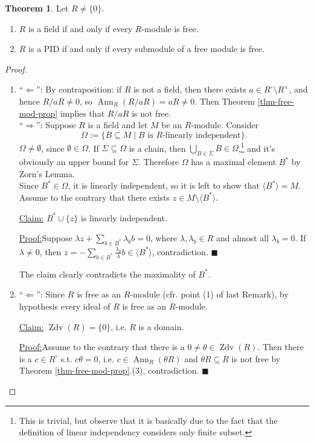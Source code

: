 \documentclass[12pt,a4paper]{report}
\theoremstyle{definition}
\newtheorem{theorem}{Theorem}[chapter] %
\theoremstyle{num.custom-title}
\newenvironment{claim}[1]{\par\noindent\underline{Claim#1:}\space}{} %
\newenvironment{claimproof}[1]{\par\noindent\underline{Proof:}\space#1}{\leavevmode\unskip\penalty9999 \hbox{}\nobreak\hfill\quad\hbox{$\blacksquare$}} %
\DeclareMathOperator{\Zdv}{Zdv}
\DeclareMathOperator{\Ann}{Ann}
\DeclareMathOperator{\imp}{\Rightarrow}
\DeclareMathOperator{\pmi}{\Leftarrow}
\DeclareMathOperator{\sm}{\setminus}
\DeclareMathOperator{\sse}{\subseteq}
\begin{document}
\begin{theorem}\label{char_fields_and_pid}
Let $R \neq \{0\}$.
\begin{enumerate}
\item $R$ is a field if and only if every $R$-module is free.
\item $R$ is a PID if and only if every submodule of a free module is free.
\end{enumerate}
\begin{proof}\ 
\begin{enumerate}
\item ``$\pmi$'': By contraposition: if $R$ is not a field, then there exists $a \in R^\circ \sm R^\times$, and hence $R/aR \neq 0$, so $\Ann_R(R/aR) = aR \neq 0$. Then Theorem \ref{thm-free-mod-prop} implies that $R/aR$ is not free.\\
``$\imp$'': Suppose $R$ is a field and let $M$ be an $R$-module. Consider
\[
\Omega := \{B \sse M \mid B \text{ is $R$-linearly independent}\}.
\]
$\Omega \neq \emptyset$, since $\emptyset \in \Omega$. If $\Sigma \sse \Omega$ is a chain, then $\bigcup_{B \in \Sigma} B \in \Omega$,\footnote{This is trivial, but observe that it is basically due to the fact that the definition of linear independency considers only finite subset.} and it's obviously an upper bound for $\Sigma$. Therefore $\Omega$ has a maximal element $B^*$ by Zorn's Lemma.\\
Since $B^* \in \Omega$, it is linearly independent, so it is left to show that $\langle B^* \rangle = M$. Assume to the contrary that there exists $z \in M \sm \langle B^* \rangle$.
\begin{claim}{}
$B^* \cup \{z\}$ is linearly independent.
\begin{claimproof}
Suppose $\lambda z + \sum_{b \in B^*} \lambda_b b =0$, where $\lambda,\lambda_b \in R$ and almost all $\lambda_b = 0$. If $\lambda \neq 0$, then $z = -\sum_{b \in B^*} \frac{\lambda_b}{\lambda} b \in \langle B^* \rangle$, contradiction.
\end{claimproof}
\end{claim}

The claim clearly contradicts the maximality of $B^*$.
\item ``$\pmi$'': Since $R$ is free as an $R$-module (cfr. point (1) of last Remark), by hypothesis every ideal of $R$ is free as an $R$-module. 
\begin{claim}{}
$\Zdv(R) = \{0\}$, i.e. $R$ is a domain.
\begin{claimproof}
Assume to the contrary that there is a $0 \neq \theta \in \Zdv(R)$. Then there is a $c \in R^\circ$ s.t. $c\theta=0$, i.e. $c \in \Ann_R(\theta R)$ and $\theta R \sse R$ is not free by Theorem \ref{thm-free-mod-prop}.(3), contradiction.
\end{claimproof}
\end{claim}


\end{enumerate}
\end{proof}
\end{theorem}
\end{document}

